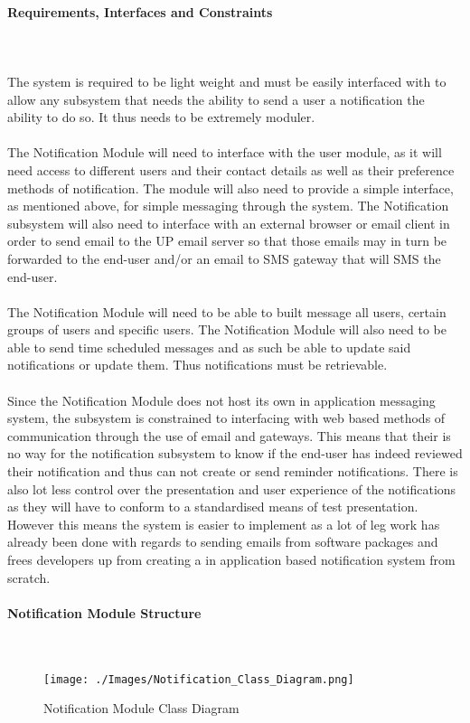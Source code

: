 \documentclass{article}
\begin{document}
			\newpage
			\paragraph	{Requirements, Interfaces and Constraints} \mbox{} \\\\
			{The system is required to be light weight and must be easily interfaced with to allow any subsystem that needs the ability to send a user a notification the ability to do so. It thus needs to be extremely moduler. \\ \\The Notification Module will need to interface with the user module, as it will need access to different users and their contact details as well as their preference methods of notification. The module will also need to provide a simple interface, as mentioned above, for simple messaging through the system. The Notification subsystem will also need to interface with an external browser or email client in order to send email to the UP email server so that those emails may in turn be forwarded to the end-user and/or an email to SMS gateway that will SMS the end-user.\\ \\The Notification Module will need to be able to built message all users, certain groups of users and specific users. The Notification Module will also need to be able to send time scheduled messages and as such be able to update said notifications or update them. Thus notifications must be retrievable.\\ \\Since the Notification Module does not host its own in application messaging system, the subsystem is constrained to interfacing with web based methods of communication through the use of email and gateways. This means that their is no way for the notification subsystem to know if the end-user has indeed reviewed their notification and thus can not create or send reminder notifications. There is also lot less control over the presentation and user experience of the notifications as they will have to conform to a standardised means of test presentation. However this means the system is easier to implement as a lot of leg work has already been done with regards to sending emails from software packages and frees developers up from creating a in application based notification system from scratch.}
		
			\newpage
			\paragraph	{Notification Module Structure} \mbox{} \\
			\begin{figure}[h]
				\texttt{[image: ./Images/Notification\_Class\_Diagram.png]} 
				\caption{Notification Module Class Diagram}
			\end{figure}
			
\end{document}
